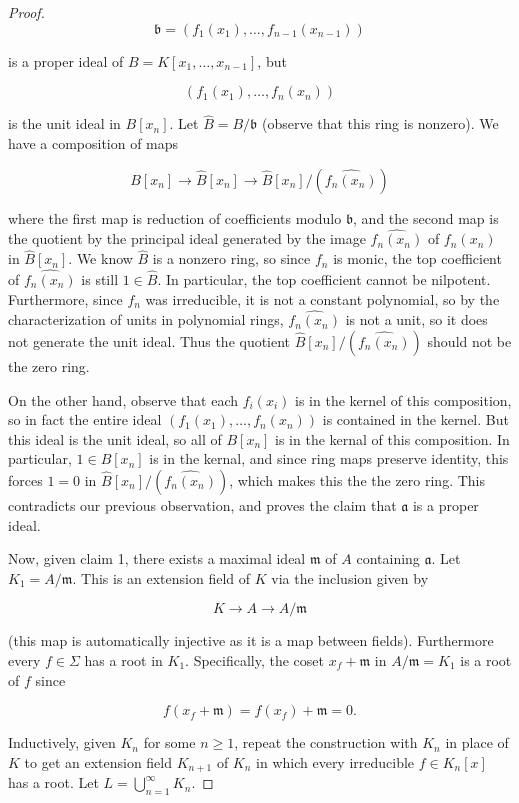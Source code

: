 \begin{proof}
\[ \mathfrak{b} = (f_1(x_1), \dotsc, f_{n-1}(x_{n-1})) \]

is a proper ideal of $ B = K[x_1, \dotsc, x_{n-1}]$, but

\[ (f_1(x_1), \dotsc, f_n(x_n)) \]

is the unit ideal in $ B[x_n]$. Let $ \hat{B} = B/\mathfrak{b}$ (observe that this ring is nonzero). We have a composition of maps

\[ B[x_n] \to \hat{B}[x_n] \to \hat{B}[x_n]/(\widehat{f_n(x_n)}) \]

where the first map is reduction of coefficients modulo $ \mathfrak{b}$, and the second map is the quotient by the principal ideal generated by the image $ \widehat{f_n(x_n)}$ of $ f_n(x_n)$ in $ \hat{B}[x_n]$. We know $ \hat{B}$ is a nonzero ring, so since $ f_n$ is monic, the top coefficient of $ \widehat{f_n(x_n)}$ is still $ 1 \in \hat{B}$. In particular, the top coefficient cannot be nilpotent. Furthermore, since $ f_n$ was irreducible, it is not a constant polynomial, so by the characterization of units in polynomial rings, $ \widehat{f_n(x_n)}$ is not a unit, so it does not generate the unit ideal. Thus the quotient $ \hat{B}[x_n]/(\widehat{f_n(x_n)})$ should not be the zero ring.

On the other hand, observe that each $ f_i(x_i)$ is in the kernel of this composition, so in fact the entire ideal $ (f_1(x_1), \dotsc, f_n(x_n))$ is contained in the kernel. But this ideal is the unit ideal, so all of $ B[x_n]$ is in the kernal of this composition. In particular, $ 1 \in B[x_n]$ is in the kernal, and since ring maps preserve identity, this forces $ 1 = 0$ in $ \hat{B}[x_n]/(\widehat{f_n(x_n)})$, which makes this the the zero ring. This contradicts our previous observation, and proves the claim that $ \mathfrak{a}$ is a proper ideal.

Now, given claim 1, there exists a maximal ideal $ \mathfrak{m}$ of $ A$ containing $ \mathfrak{a}$. Let $ K_1 = A/\mathfrak{m}$. This is an extension field of $ K$ via the inclusion given by

\[ K \to A \to A/\mathfrak{m} \]

(this map is automatically injective as it is a map between fields). Furthermore every $ f \in \Sigma$ has a root in $ K_1$. Specifically, the coset $ x_f + \mathfrak{m}$ in $ A/\mathfrak{m} = K_1$ is a root of $ f$ since

\[ f(x_f + \mathfrak{m}) = f(x_f) + \mathfrak{m} = 0. \]

Inductively, given $ K_n$ for some $ n \geq 1$, repeat the construction with $ K_n$ in place of $ K$ to get an extension field $ K_{n+1}$ of $ K_n$ in which every irreducible $ f \in K_n[x]$ has a root. Let $ L = \bigcup_{n = 1}^{\infty} K_n$.


\end{proof}
